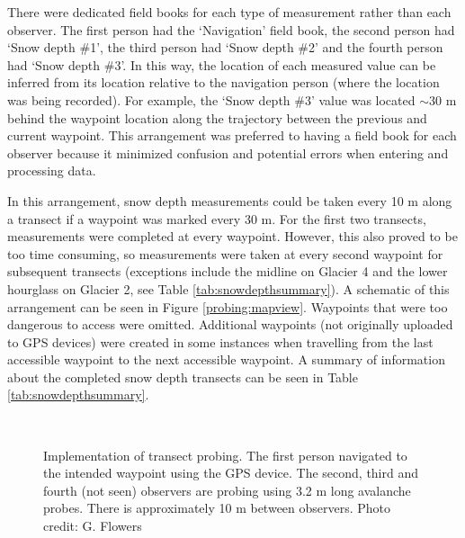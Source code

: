 \documentclass{sfuthesis}
\begin{document}
There were dedicated field books for each type of measurement rather than each observer. The first person had the `Navigation' field book, the second person had `Snow depth \#1', the third person had `Snow depth \#2' and the fourth person had `Snow depth \#3'. In this way, the location of each measured value can be inferred from its location relative to the navigation person (where the location was being recorded). For example, the `Snow depth \#3' value was located $\sim$30 m behind the waypoint location along the trajectory between the previous and current waypoint. This arrangement was preferred to having a field book for each observer because it minimized confusion and potential errors when entering and processing data.

In this arrangement, snow depth measurements could be taken every 10 m along a transect if a waypoint was marked every 30 m. For the first two transects, measurements were completed at every waypoint. However, this also proved to be too time consuming, so measurements were taken at every second waypoint for subsequent transects (exceptions include the midline on Glacier 4 and the lower hourglass on Glacier 2, see Table \ref{tab:snowdepthsummary}). A schematic of this arrangement can be seen in Figure \ref{probing:mapview}. Waypoints that were too dangerous to access were omitted. Additional waypoints (not originally uploaded to GPS devices) were created in some instances when travelling from the last accessible waypoint to the next accessible waypoint. A summary of information about the completed snow depth transects can be seen in Table \ref{tab:snowdepthsummary}.

\begin{figure}[H]
	\centering
	\\
	\caption[Implementation of transect probing]{Implementation of transect probing. The first person navigated to the intended waypoint using the GPS device. The second, third and fourth (not seen) observers are probing using 3.2 m long avalanche probes. There is approximately 10 m between observers. Photo credit: G. Flowers}
	\label{photo_probing}
	\end{figure}
\end{document}
